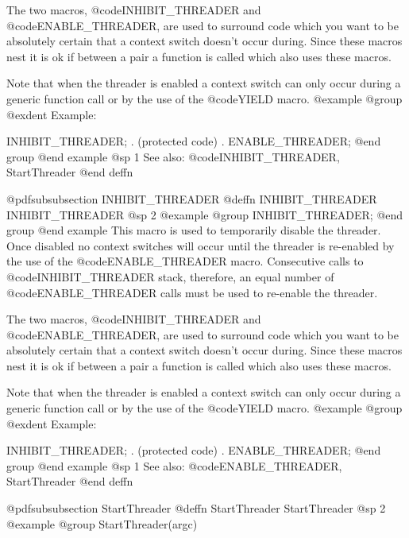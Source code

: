 The two macros, @code{INHIBIT_THREADER} and @code{ENABLE_THREADER},
are used to surround code which you want to be absolutely certain
that a context switch doesn't occur during.  Since these macros nest
it is ok if between a pair a function is called which also uses these
macros.

Note that when the threader is enabled a context switch can only occur
during a generic function call or by the use of the @code{YIELD}
macro.
@example
@group
@exdent Example:

INHIBIT_THREADER;
       .
  (protected code)
       .
ENABLE_THREADER;
@end group
@end example
@sp 1
See also:  @code{INHIBIT_THREADER, StartThreader}
@end deffn


















@pdfsubsubsection {INHIBIT_THREADER}
@deffn {INHIBIT_THREADER} INHIBIT_THREADER
@sp 2
@example
@group
INHIBIT_THREADER;
@end group
@end example
This macro is used to temporarily disable the threader.  Once disabled
no context switches will occur until the threader is re-enabled by the
use of the @code{ENABLE_THREADER} macro.  Consecutive calls to
@code{INHIBIT_THREADER} stack, therefore, an equal number of
@code{ENABLE_THREADER} calls must be used to re-enable the threader.

The two macros, @code{INHIBIT_THREADER} and @code{ENABLE_THREADER},
are used to surround code which you want to be absolutely certain
that a context switch doesn't occur during.  Since these macros nest
it is ok if between a pair a function is called which also uses these
macros.

Note that when the threader is enabled a context switch can only occur
during a generic function call or by the use of the @code{YIELD}
macro.
@example
@group
@exdent Example:

INHIBIT_THREADER;
       .
  (protected code)
       .
ENABLE_THREADER;
@end group
@end example
@sp 1
See also:  @code{ENABLE_THREADER, StartThreader}
@end deffn








@pdfsubsubsection {StartThreader}
@deffn {StartThreader} StartThreader
@sp 2
@example
@group
StartThreader(argc)

